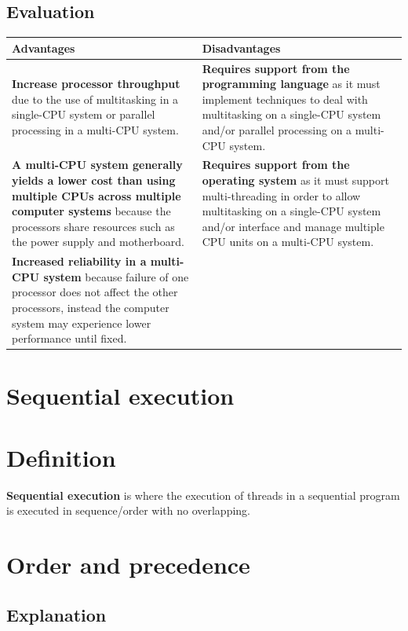 \documentclass[a4paper]{systems-software}
\begin{document}
\subsection*{Evaluation}

\begin{longtabu} to \textwidth {|X[1,l]|X[1,l]|}
    \hline
    \textbf{Advantages} & \textbf{Disadvantages}
    \\ \hline
    \textbf{Increase processor throughput} due to the use of multitasking in a single-CPU system or parallel processing in a multi-CPU system.
    &
    \textbf{Requires support from the programming language} as it must implement techniques to deal with multitasking on a single-CPU system and/or parallel processing on a multi-CPU system.
    \\ \hline
  	\textbf{A multi-CPU system generally yields a lower cost than using multiple CPUs across multiple computer systems} because the processors share resources such as the power supply and motherboard.
    &
    \textbf{Requires support from the operating system} as it must support multi-threading in order to allow multitasking on a single-CPU system and/or interface and manage multiple CPU units on a multi-CPU system.
    \\ \hline
    \textbf{Increased reliability in a multi-CPU system} because failure of one processor does not affect the other processors, instead the computer system may experience lower performance until fixed.
    &
	\\ \hline
\end{longtabu}


\section{Sequential execution}

\section*{Definition}

\textbf{Sequential execution} is where the execution of threads in a sequential program is executed in sequence/order with no overlapping.


\section*{Order and precedence}

\subsection*{Explanation}
\end{document}
